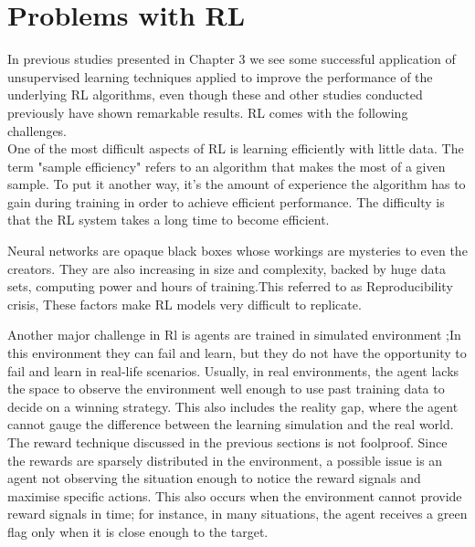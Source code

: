 %		


\section{Problems with RL}
\label{sec-rl-problems}

In previous studies presented in Chapter 3 we see some successful application
of unsupervised learning techniques applied to improve the performance of the
underlying RL algorithms, even though these and other studies conducted
previously have shown remarkable results. RL comes with the following
challenges. \\

One of the most difficult aspects of RL is learning efficiently with little
data. The term "sample efficiency" refers to an algorithm that makes the most
of a given sample. To put it another way, it's the amount of experience the
algorithm has to gain during training in order to achieve efficient
performance. The difficulty is that the RL system takes a long time to become
efficient.

Neural networks are opaque black boxes whose workings are mysteries to even the
creators. They are also increasing in size and complexity, backed by huge data
sets, computing power and hours of training.This referred to as Reproducibility
crisis, These factors make RL models very difficult to replicate.  

Another major challenge in Rl is agents are trained in simulated environment
;In this environment they can fail and learn, but they do not have the
opportunity to fail and learn in real-life scenarios. Usually, in real
environments, the agent lacks the space to observe the environment well enough
to use past training data to decide on a winning strategy. This also includes
the reality gap, where the agent cannot gauge the difference between the
learning simulation and the real world.\\

The reward technique discussed in the previous sections is not foolproof. Since
the rewards are sparsely distributed in the environment, a possible issue is an
agent not observing the situation enough to notice the reward signals and
maximise specific actions. This also occurs when the environment cannot provide
reward signals in time; for instance, in many situations, the agent receives a
green flag only when it is close enough to the target. 

